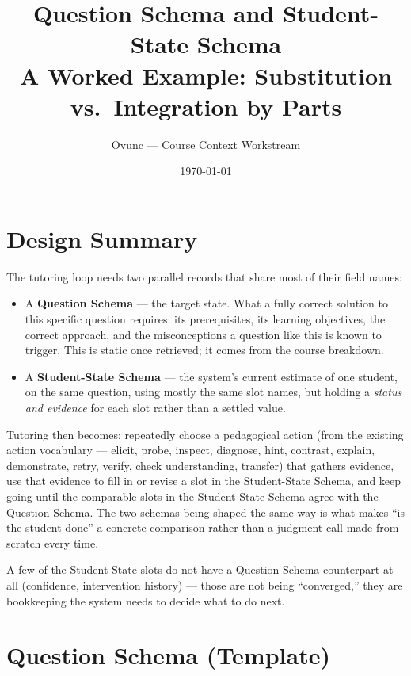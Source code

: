 \documentclass[11pt]{article}
\title{Question Schema and Student-State Schema\\
\large A Worked Example: Substitution vs.\ Integration by Parts}
\author{Ovunc --- Course Context Workstream}
\date{\today}
\begin{document}
\maketitle

\section{Design Summary}

The tutoring loop needs two parallel records that share most of their field
names:

\begin{itemize}
  \item A \textbf{Question Schema} --- the target state. What a fully correct
  solution to this specific question requires: its prerequisites, its
  learning objectives, the correct approach, and the misconceptions a
  question like this is known to trigger. This is static once retrieved; it
  comes from the course breakdown.

  \item A \textbf{Student-State Schema} --- the system's current estimate of
  one student, on the same question, using mostly the same slot names, but
  holding a \emph{status and evidence} for each slot rather than a settled
  value.
\end{itemize}

Tutoring then becomes: repeatedly choose a pedagogical action (from the
existing action vocabulary --- elicit, probe, inspect, diagnose, hint,
contrast, explain, demonstrate, retry, verify, check understanding,
transfer) that gathers evidence, use that evidence to fill in or revise a
slot in the Student-State Schema, and keep going until the comparable slots
in the Student-State Schema agree with the Question Schema. The two schemas
being shaped the same way is what makes ``is the student done'' a concrete
comparison rather than a judgment call made from scratch every time.

A few of the Student-State slots do not have a Question-Schema counterpart
at all (confidence, intervention history) --- those are not being
``converged,'' they are bookkeeping the system needs to decide what to do
next.

\section{Question Schema (Template)}
\end{document}

